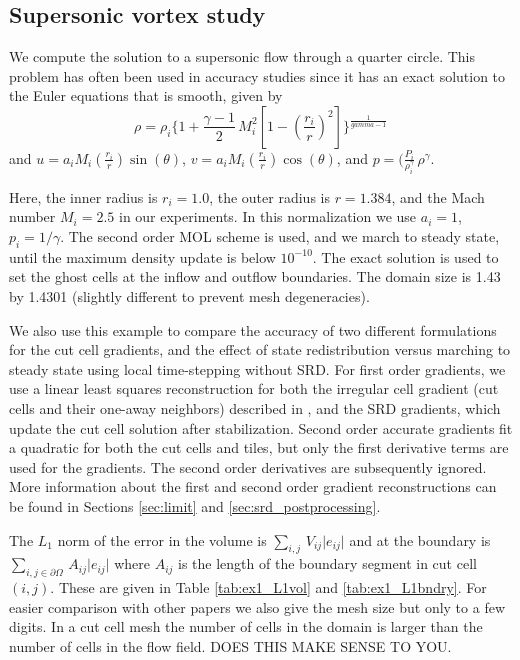 \subsection{Supersonic vortex study}\label{sec:ssv}
We compute the solution to a supersonic flow 
through a quarter circle.  This problem has often been used in accuracy 
studies \cite{aftosmis:acc} since it has an exact solution to the Euler
equations that is smooth, given by 
\begin{equation}
\rho = \rho_i \{ 1 + \frac{\gamma-1}{2} \, M_i^2 \left [ 1 - (\frac{r_i}{r})^2 \right ]\} ^
{\frac{1}{gamma-1}}
\end{equation}
and $ u = a_i M_i (\frac{r_i}{r}) \sin(\theta)$, 
$ v = a_i M_i (\frac{r_i}{r}) \cos(\theta)$, and
$ p = (\frac{P_i}{\rho_i^\gamma} \, \rho^\gamma$.

Here, the inner radius is $r_i = 1.0$,  the outer radius
is $r = 1.384$, and the Mach number $M_i = 2.5$ in our experiments. In this
normalization we use $a_i = 1$, $p_i = 1/\gamma$. 
The second order MOL scheme is used, and we march
to steady state, until the maximum density update is below $10^{-10}$.  
The exact solution is used to set the ghost cells at the inflow and
outflow boundaries. The domain size is 1.43 by 1.4301 (slightly different
to prevent mesh  degeneracies).  

We also use this example to compare the accuracy of two different formulations
for the cut cell gradients, and the effect of state redistribution versus 
marching to steady state using local time-stepping without SRD.  
For first order gradients, we use a linear least squares reconstruction for
both the irregular cell gradient (cut cells and their one-away neighbors) described in , and the SRD gradients, which update the cut cell solution after stabilization. Second order accurate gradients fit a quadratic for both
the cut cells and tiles, but only the first derivative terms are used for 
the gradients. The second order derivatives are subsequently ignored.  More information about the first and second order gradient reconstructions can be found in Sections \ref{sec:limit} and \ref{sec:srd_postprocessing}.

The $L_1$ norm of the error in the volume is $\sum_{i,j} \,
V_{ij} \lvert e_{ij } \rvert$ and at the boundary is $ \sum_{{i,j} \in \partial \Omega} \, A_{ij} \lvert e_{ij
} \rvert$ where $A_{ij}$ is the length of the boundary segment in cut cell $(i,j)$.
These are given in Table \ref{tab:ex1_L1vol} and \ref{tab:ex1_L1bndry}. 
For easier comparison with other papers we also give the mesh size but only to a few digits. 
In a cut cell mesh the number of cells in the domain is larger than the 
number of cells in the flow field. DOES THIS MAKE SENSE TO YOU.

